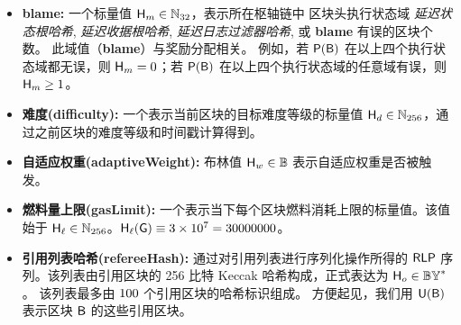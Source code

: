 \begin{itemize}[nosep]
	\item {\bf blame:} 一个标量值 $\textsf{H}_{m}\in\mathbb{N}_{32}$，表示所在枢轴链中
	区块头执行状态域 \emph{延迟状态根哈希}, \emph{延迟收据根哈希}, \emph{延迟日志过滤器哈希}, 或 {\bf blame} 有误的区块个数。
	此域值（{\bf blame}）与奖励分配相关。
	例如，若 $\mathsf{P}{\left({\textsf{B}} \right)}$ 在以上四个执行状态域都无误，则 $\textsf{H}_{m}=0$；若 $\mathsf{P}{\left({\textsf{B}} \right)}$ 在以上四个执行状态域的任意域有误，则 $\textsf{H}_{m} \ge 1$。

	\item {\bf 难度(difficulty):} 一个表示当前区块的目标难度等级的标量值 $\textsf{H}_d\in\mathbb{N}_{256}$，通过之前区块的难度等级和时间戳计算得到。

	\item {\bf 自适应权重(adaptiveWeight):} 布林值 $\textsf{H}_w\in\mathbb{B}$ 表示自适应权重是否被触发。

	\item {\bf 燃料量上限(gasLimit):} 一个表示当下每个区块燃料消耗上限的标量值。该值始于 $\textsf{H}_{\ell}\in\mathbb{N}_{256}$。$\textsf{H}_{\ell}(\textsf{G})\equiv 3\times 10^7=30000000$。

	\item {\bf 引用列表哈希(refereeHash):} 通过对引用列表进行序列化操作所得的 $\mathsf{RLP}$ 序列。该列表由引用区块的 256 比特 Keccak 哈希构成，正式表达为 $\textsf{H}_o \in\mathbb{BY}^*$。
	该列表最多由 $100$ 个引用区块的哈希标识组成。
	方便起见，我们用 $\textsf{U}(\textsf{B})$ 表示区块 $\textsf{B}$ 的这些引用区块。
	

\end{itemize}
